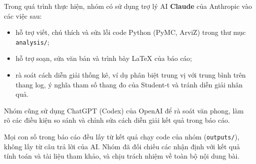 \documentclass[12pt,a4paper]{report}
\begin{document}
Trong quá trình thực hiện, nhóm có sử dụng trợ lý AI \textbf{Claude} của
Anthropic vào các việc sau:

\begin{itemize}
  \item hỗ trợ viết, chú thích và sửa lỗi code Python (PyMC, ArviZ) trong thư mục
    \texttt{analysis/};
  \item hỗ trợ soạn, sửa văn bản và trình bày LaTeX của báo cáo;
  \item rà soát cách diễn giải thống kê, ví dụ phân biệt trung vị với trung bình
    trên thang log, ý nghĩa tham số thang đo của Student-t và tránh diễn giải
    nhân quả.
\end{itemize}

Nhóm cũng sử dụng ChatGPT (Codex) của OpenAI để rà soát văn phong, làm rõ các
điều kiện so sánh và chỉnh sửa cách diễn giải kết quả trong báo cáo.

Mọi con số trong báo cáo đều lấy từ kết quả chạy code của nhóm
(\texttt{outputs/}), không lấy từ câu trả lời của AI. Nhóm đã đối chiếu các nhận
định với kết quả tính toán và tài liệu tham khảo, và chịu trách nhiệm về toàn bộ
nội dung bài.

\newpage

\printbibliography[heading=bibintoc,title={Tài liệu tham khảo}]
\end{document}
